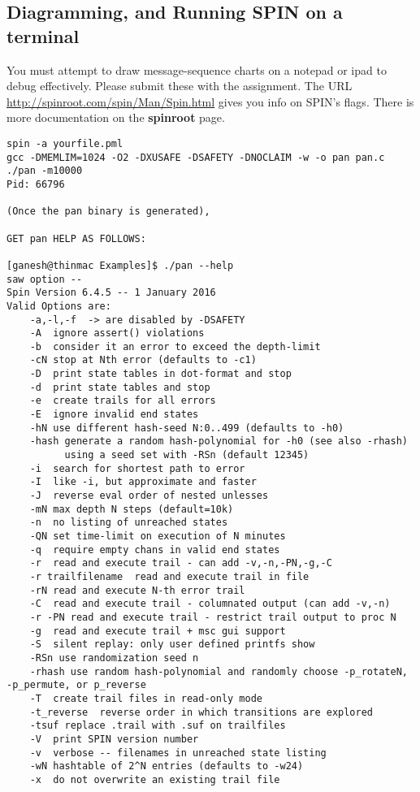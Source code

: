 \documentclass[11pt]{article}
\begin{document}
    \clearpage
    
\subsection*{Diagramming, and Running SPIN on a terminal}

You must attempt to draw message-sequence charts on a notepad or ipad to debug effectively.
Please submit these with the assignment.
The URL \url{http://spinroot.com/spin/Man/Spin.html} gives you info on SPIN's flags.
There is more documentation on the {\bf spinroot} page.

\begin{scriptsize}
\begin{verbatim}
spin -a yourfile.pml
gcc -DMEMLIM=1024 -O2 -DXUSAFE -DSAFETY -DNOCLAIM -w -o pan pan.c
./pan -m10000 
Pid: 66796

(Once the pan binary is generated),

GET pan HELP AS FOLLOWS:

[ganesh@thinmac Examples]$ ./pan --help
saw option --
Spin Version 6.4.5 -- 1 January 2016
Valid Options are:
	-a,-l,-f  -> are disabled by -DSAFETY
	-A  ignore assert() violations
	-b  consider it an error to exceed the depth-limit
	-cN stop at Nth error (defaults to -c1)
	-D  print state tables in dot-format and stop
	-d  print state tables and stop
	-e  create trails for all errors
	-E  ignore invalid end states
	-hN use different hash-seed N:0..499 (defaults to -h0)
	-hash generate a random hash-polynomial for -h0 (see also -rhash)
	      using a seed set with -RSn (default 12345)
	-i  search for shortest path to error
	-I  like -i, but approximate and faster
	-J  reverse eval order of nested unlesses
	-mN max depth N steps (default=10k)
	-n  no listing of unreached states
	-QN set time-limit on execution of N minutes
	-q  require empty chans in valid end states
	-r  read and execute trail - can add -v,-n,-PN,-g,-C
	-r trailfilename  read and execute trail in file
	-rN read and execute N-th error trail
	-C  read and execute trail - columnated output (can add -v,-n)
	-r -PN read and execute trail - restrict trail output to proc N
	-g  read and execute trail + msc gui support
	-S  silent replay: only user defined printfs show
	-RSn use randomization seed n
	-rhash use random hash-polynomial and randomly choose -p_rotateN, -p_permute, or p_reverse
	-T  create trail files in read-only mode
	-t_reverse  reverse order in which transitions are explored
	-tsuf replace .trail with .suf on trailfiles
	-V  print SPIN version number
	-v  verbose -- filenames in unreached state listing
	-wN hashtable of 2^N entries (defaults to -w24)
	-x  do not overwrite an existing trail file


\end{verbatim}
\end{scriptsize}
\end{document}
